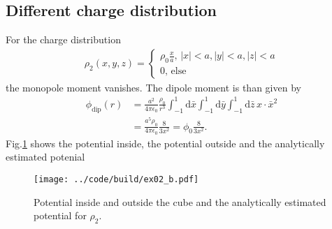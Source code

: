 \subsection{Different charge distribution}
For the charge distribution 
\begin{align}
    \rho_2 (x,y,z) = \begin{cases}
        \rho_0 \frac{x}{a}, \, |x| < a, |y| < a, |z| < a \\
        0, \, \text{else} 
    \end{cases}
\end{align}
the monopole moment vanishes. The dipole moment is than given by
\begin{align}
    \phi_{\text{dip}}(r) &= \frac{a^2}{4 \pi \epsilon_0} \frac{\rho_0}{r^3} \int_{-1}^1 \text{d}\bar{x} \int_{-1}^1 \text{d}\bar{y} \int_{-1}^1 \text{d}\bar{z} \, x\cdot \bar{x}^2 \\
    &=\frac{a^5 \rho_0}{4 \pi \epsilon_0} \frac{8}{3 x^2} = \phi_0 \frac{8}{3x^2}.
\end{align}
Fig.\ref{fig:ex02_b} shows the potential inside, the potential outside and the analytically estimated potenial

\begin{figure}[h]
    \centering
    \texttt{[image: ../code/build/ex02\_b.pdf]}
    \caption{Potential inside and outside the cube and the analytically estimated potential for $\rho_2$.}
    \label{fig:ex02_b}
\end{figure}